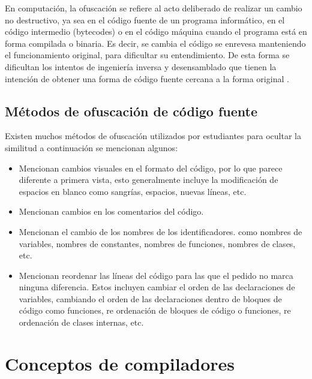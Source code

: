 En computación, la ofuscación se refiere al acto deliberado de realizar un cambio no destructivo, ya sea en el código fuente de un programa informático, en el código intermedio (bytecodes) o en el código máquina cuando el programa está en forma compilada o binaria. Es decir, se cambia el código se enrevesa manteniendo el funcionamiento original, para dificultar su entendimiento. De esta forma se dificultan los intentos de ingeniería inversa y desensamblado que tienen la intención de obtener una forma de código fuente cercana a la forma original \cite{wiki:Obfuscation_(software)}.

\subsection{Métodos de ofuscación de código fuente}
Existen muchos métodos de ofuscación utilizados por estudiantes para ocultar la similitud a continuación se mencionan algunos:
\begin{itemize}
    \item \cite{article3} Mencionan cambios visuales en el formato del código, por lo que parece diferente a primera vista, esto generalmente incluye la modificación de espacios en blanco como sangrías, espacios, nuevas líneas, etc.
    \item \cite{article3} Mencionan cambios en los comentarios del código.
    \item \cite{donaldson1981plagiarism} Mencionan el cambio de los nombres de los identificadores. como nombres de variables, nombres de constantes, nombres de funciones, nombres de clases, etc.
    \item \cite{donaldson1981plagiarism} Mencionan reordenar las líneas del código para las que el pedido no marca ninguna diferencia. Estos incluyen cambiar el orden de las declaraciones de variables, cambiando el orden de las declaraciones dentro de bloques de código como funciones, re ordenación de bloques de código o funciones, re ordenación de clases internas, etc.
\end{itemize}

\section{Conceptos de compiladores}

